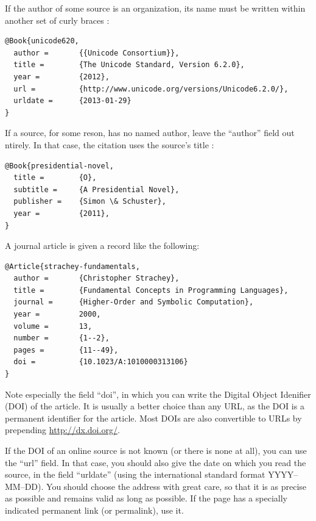 \documentclass[utf8,bachelor,english]{gradu3}
\begin{document}
If the author of some source is an organization, its name must be written
within another set of curly braces \parencite[eg.][]{unicode620}:

\begingroup\footnotesize
\begin{verbatim}
@Book{unicode620,
  author =       {{Unicode Consortium}},
  title =        {The Unicode Standard, Version 6.2.0},
  year =         {2012},
  url =          {http://www.unicode.org/versions/Unicode6.2.0/},
  urldate =      {2013-01-29}
}
\end{verbatim}
\endgroup

If a source, for some reson, has no named author, leave the ``author''
field out ntirely.  In that case, the citation uses the source's
title \parencite[eg.][]{presidential-novel}:

\begingroup\footnotesize
\begin{verbatim}
@Book{presidential-novel,
  title =        {O},
  subtitle =     {A Presidential Novel},
  publisher =    {Simon \& Schuster},
  year =         {2011},
}
\end{verbatim}
\endgroup

A journal article \parencite[eg.][]{strachey-fundamentals} is given a
record like the following:

\begingroup\footnotesize
\begin{verbatim}
@Article{strachey-fundamentals,
  author =       {Christopher Strachey},
  title =        {Fundamental Concepts in Programming Languages},
  journal =      {Higher-Order and Symbolic Computation},
  year =         2000,
  volume =       13,
  number =       {1--2},
  pages =        {11--49},
  doi =          {10.1023/A:1010000313106}
}
\end{verbatim}
\endgroup

Note especially the field ``doi'', in which you can write the Digital
Object Idenifier (DOI) of the article.  It is usually a better choice
than any URL, as the DOI is a permanent identifier for the article.
Most DOIs are also convertible to URLs by prepending
\url{http://dx.doi.org/}.

If the DOI of an online source is not known (or there is none at all),
you can use the ``url'' field.  In that case, you should also give the
date on which you read the source, in the field ``urldate'' (using the
international standard format YYYY--MM--DD).  You should choose the
address with great care, so that it is as precise as possible and
remains valid as long as possible.  If the page has a specially
indicated permanent link (or permalink), use it.
\end{document}
